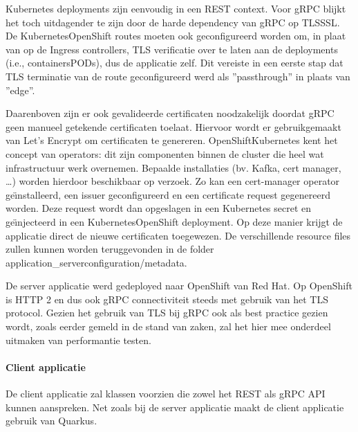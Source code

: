 Kubernetes deployments zijn eenvoudig in een REST context. Voor gRPC blijkt het toch uitdagender te zijn door de harde dependency van gRPC op TLS\/SSL.
De Kubernetes\/OpenShift routes moeten ook geconfigureerd worden om, in plaat van op de Ingress controllers, TLS
verificatie over te laten aan de deployments (i.e., containers\/PODs), dus de applicatie zelf. Dit vereiste in een eerste stap dat TLS terminatie van de route
geconfigureerd werd als ''passthrough'' in plaats van ''edge''.

Daarenboven zijn er ook gevalideerde certificaten noodzakelijk doordat gRPC geen manueel getekende certificaten toelaat.
Hiervoor wordt er gebruikgemaakt van Let's Encrypt om certificaten te genereren.
OpenShift\/Kubernetes kent het concept van operators: dit zijn componenten binnen de cluster die heel wat infrastructuur werk overnemen.
Bepaalde installaties (bv. Kafka, cert manager, \ldots) worden hierdoor beschikbaar op verzoek.
Zo kan een cert-manager operator ge\"{\i}nstalleerd, een issuer geconfigureerd en een certificate request gegenereerd worden.
Deze request wordt dan opgeslagen in een Kubernetes secret en ge\"{\i}njecteerd in een Kubernetes\/OpenShift deployment.
Op deze manier krijgt de applicatie direct de nieuwe certificaten toegewezen.
De verschillende resource files zullen kunnen worden teruggevonden in de folder application\_server\/configuration/metadata.

De server applicatie werd gedeployed naar OpenShift van Red Hat. Op OpenShift is HTTP 2 en dus ook gRPC connectiviteit steeds met gebruik van het TLS protocol.
Gezien het gebruik van TLS bij gRPC ook als best practice gezien wordt, zoals eerder gemeld in de stand van zaken, zal het hier mee onderdeel uitmaken van performantie testen.\newline
~\autocite{openshifttls}

\paragraph{Client applicatie}

De client applicatie zal klassen voorzien die zowel het REST als gRPC API kunnen aanspreken.
Net zoals bij de server applicatie maakt de client applicatie gebruik van Quarkus.\\

